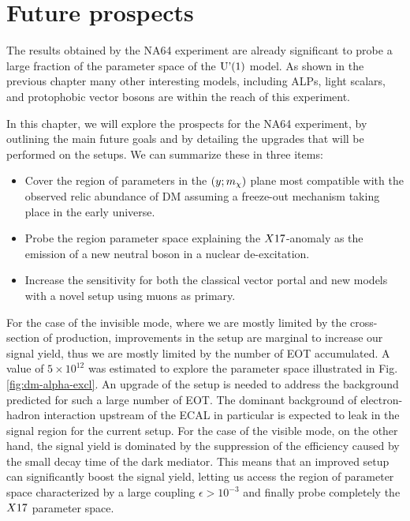 
\newcommand{\pdirfive}{chapters/plots/chapter5}

\chapter{Future prospects} %
\label{chapter5} %

The results obtained by the NA64 experiment are already significant to probe a large fraction of the parameter space of the $\textrm{U'(1)}$ model. As shown in the previous chapter many other interesting models, including ALPs, light scalars, and protophobic vector bosons are within the reach of this experiment.

In this chapter, we will explore the prospects for the NA64 experiment, by outlining the main future goals and by detailing the upgrades that will be performed on the setups. We can summarize these in three items:

\begin{itemize}
\item Cover the region of parameters in the $(y;m_{\chi})$ plane most compatible with the observed relic abundance of DM assuming a freeze-out mechanism taking place in the early universe.
\item Probe the region parameter space explaining the $X17$-anomaly as the emission of a new neutral boson in a nuclear de-excitation.
\item Increase the sensitivity for both the classical vector portal and new models with a novel setup using muons as primary.
\end{itemize}

For the case of the invisible mode, where we are mostly limited by the cross-section of production, improvements in the setup are marginal to increase our signal yield, thus we are mostly limited by the number of EOT accumulated. A value of $5 \times 10^{12}$ was estimated to explore the parameter space illustrated in Fig.\ref{fig:dm-alpha-excl}. An upgrade of the setup is needed to address the background predicted for such a large number of EOT. The dominant background of electron-hadron interaction upstream of the ECAL in particular is expected to leak in the signal region for the current setup.
For the case of the visible mode, on the other hand, the signal yield is dominated by the suppression of the efficiency caused by the small decay time of the dark mediator. This means that an improved setup can significantly boost the signal yield, letting us access the region of parameter space characterized by a large coupling $\epsilon > 10^{-3}$ and finally probe completely the $X17$ parameter space.

